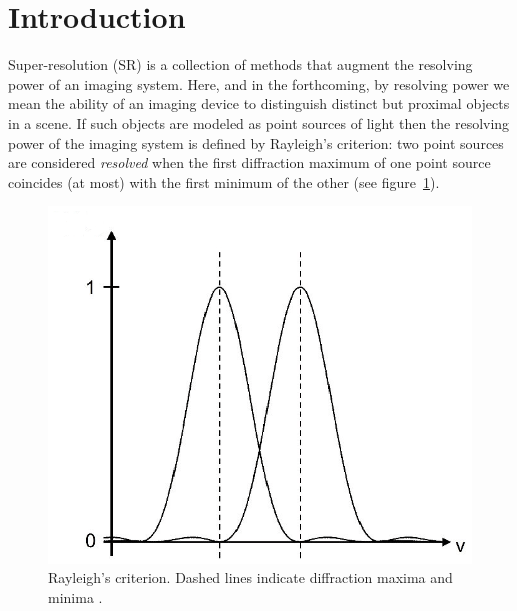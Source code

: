 \section{Introduction}\label{sec:introduction}

Super-resolution (SR) is a collection of methods that augment the resolving power of an imaging system.
%
Here, and in the forthcoming, by resolving power we mean the ability of an imaging device to distinguish distinct but proximal objects in a scene.
%
If such objects are modeled as point sources of light then the resolving power of the imaging system is defined by Rayleigh's criterion: two point sources are considered \textit{resolved} when the first diffraction maximum of one point source coincides (at most) with the first minimum of the other (see figure~\ref{fig:rayleigh}).
\begin{figure}[!htbp]
	\center
	\includegraphics[width=\linewidth,keepaspectratio]{figures/classical/rayleigh.png}
	\caption{Rayleigh's criterion. Dashed lines indicate diffraction maxima and minima \cite{rayleigh}.}
	\label{fig:rayleigh}
\end{figure}

